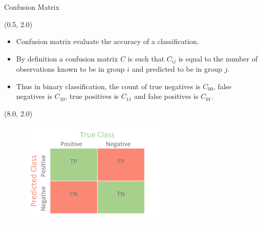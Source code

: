 \documentclass[12pt, xcolor={dvipsnames}, aspectratio = 169]{beamer}
\begin{document}
\begin{frame}{Confusion Matrix}

\begin{textblock}{7.0}(0.5, 2.0)
\begin{itemize}
    \item Confusion matrix evaluate the accuracy of a classification.
    
    \item By definition a confusion matrix $C$ is such that $C_{ij}$ is equal to the number of observations known to be in group $i$ and predicted to be in group $j$.
    
    \item Thus in binary classification, the count of true negatives is $C_{00}$, false negatives is $C_{10}$, true positives is $C_{11}$ and false positives is $C_{01}$.
\end{itemize}
\end{textblock}

\begin{textblock}{7.0}(8.0, 2.0)
\begin{figure}
    \centering
    \includegraphics[width=7.0cm]{../imgs/con-mat.png}
\end{figure}
\end{textblock}

\end{frame}
\end{document}
